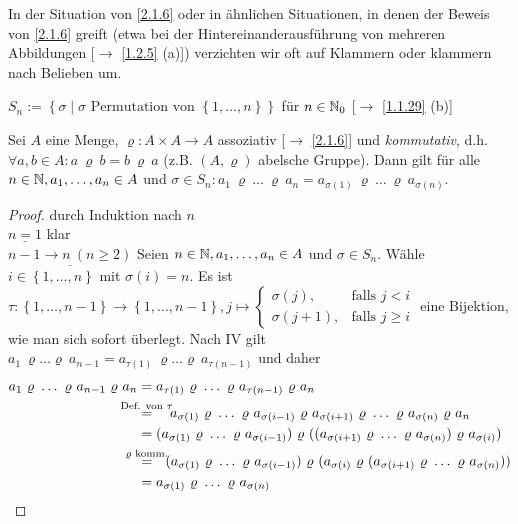 \documentclass[../../main.tex]{subfiles}
\begin{document}
\begin{nt}\label{2.1.7}
In der Situation von \ref{2.1.6} oder in ähnlichen Situationen, in denen der Beweis von \ref{2.1.6} greift (etwa bei der Hintereinanderausführung von mehreren Abbildungen [$\rightarrow$ \ref{1.2.5} (a)]) verzichten wir oft auf Klammern oder klammern nach Belieben um.
\end{nt}

\begin{nt}\label{2.1.8}
$S_n:=\left\{\sigma\mid \sigma \text{ Permutation von }\left\{1,\ldots,n\right\}\right\}$ für $n\in \mathbb N_0$ [$\rightarrow$ \ref{1.1.29} (b)]
\end{nt}

\begin{sat}\label{2.1.9}
Sei $A$ eine Menge, $\varrho: A\times A\rightarrow A$ assoziativ {\rm[$\rightarrow$ \ref{2.1.6}]} und \emph{kommutativ}, d.h. $\forall a,b\in A: a~\varrho~ b  = b~\varrho~ a$ (z.B. $(A,\varrho)$ abelsche Gruppe). Dann gilt für alle $n\in\mathbb N,a_1,\ldots,a_n\in A$ und $\sigma\in S_n: a_1~\varrho~\ldots~\varrho~ a_n=a_{\sigma(1)}~\varrho~ \ldots~\varrho~ a_{\sigma(n)}$.
\end{sat}
\begin{proof}
durch Induktion nach $n$\\
$\underline{n=1}$ klar\\
$\underline{n-1\rightarrow n ~(n\geq 2)}$ Seien $n\in \mathbb N, a_1,\ldots,a_n\in A$ und $\sigma \in S_n$. Wähle $i\in\left\{1,\ldots,n\right\}$ mit $\sigma(i)=n$. Es ist $\tau: \left\{1,\ldots,n-1\right\}\rightarrow \left\{1,\ldots,n-1\right\}, j\mapsto \begin{cases}\sigma(j), & \text{falls } j<i\\ \sigma(j+1), &\text{falls } j\geq i\end{cases}$ eine Bijektion, wie man sich sofort überlegt. Nach IV gilt $a_1~\varrho\dots\varrho~a_{n-1}=a_{\tau(1)}~\varrho\dots\varrho~a_{\tau(n-1)}$ und daher 
\begin{align*}
a_1~\varrho~\ldots~\varrho~ a_{n-1}~\varrho~ a_n & = a_{\tau(1)}~\varrho~\ldots~\varrho~ a_{\tau(n-1)}~\varrho~ a_n \\
& \overset{\mathclap{\text{Def. von } \tau}}=~~~ a_{\sigma(1)}~\varrho~\ldots~\varrho~ a_{\sigma(i-1)}~\varrho~a_{\sigma(i+1)}~\varrho~\ldots~\varrho~a_{\sigma(n)}~\varrho~ a_n\\
& = (a_{\sigma(1)}~\varrho~\ldots~\varrho~a_{\sigma(i-1)})~\varrho~((a_{\sigma(i+1)}~\varrho~\ldots~\varrho~a_{\sigma(n)})~\varrho~a_{\sigma(i)})\\
&\overset{\mathclap{\varrho\text{ komm.}}}=~~(a_{\sigma(1)}~\varrho~\ldots~\varrho~a_{\sigma(i-1)})~\varrho~(a_{\sigma(i)}~\varrho~(a_{\sigma(i+1)}~\varrho~\ldots~\varrho~a_{\sigma(n)}))\\
& = a_{\sigma(1)}~\varrho~\ldots~\varrho~ a_{\sigma(n)}
\end{align*}
\end{proof}
\end{document}
